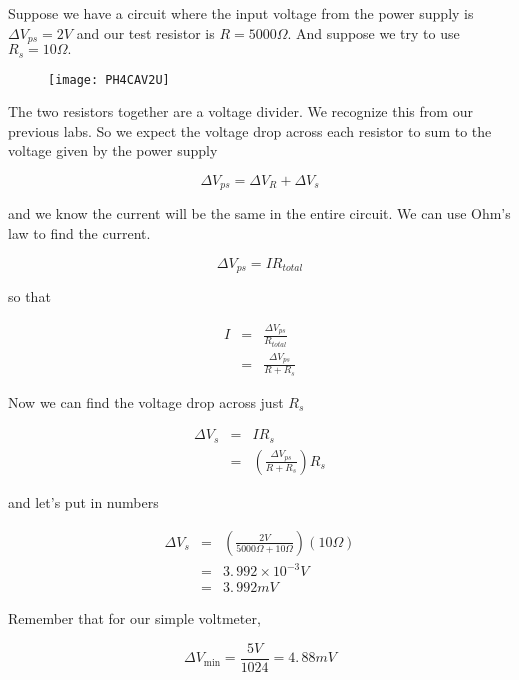 Suppose we have a circuit where the input voltage from the power supply is $\Delta V_{ps}=2\unit{V}$ and our test resistor is $R=5000\unit{\Omega}.$ And suppose we try to use $R_{s}=10\unit{\Omega}.$ 

\begin{figure}[h!]
	\texttt{[image: PH4CAV2U]}
\end{figure}

The two resistors together are a voltage divider. We recognize this from our previous labs. So we expect the voltage drop across each resistor to sum to the voltage given by the power supply

\begin{equation*}
	\Delta V_{ps}=\Delta V_{R}+\Delta V_{s}
\end{equation*}

\noindent and we know the current will be the same in the entire circuit. We can use Ohm's law to find the current.

\begin{equation*}
	\Delta V_{ps}=IR_{total}
\end{equation*}

\noindent so that 

\begin{eqnarray*}
	I &=&\frac{\Delta V_{ps}}{R_{total}} \\
	  &=&\frac{\Delta V_{ps}}{R+R_{s}}
\end{eqnarray*}

Now we can find the voltage drop across just $R_{s}$

\begin{eqnarray*}
	\Delta V_{s} &=&IR_{s} \\
                 &=&\left( \frac{\Delta V_{ps}}{R+R_{s}}\right) R_{s}
\end{eqnarray*}

\noindent and let's put in numbers

\begin{eqnarray*}
	\Delta V_{s} &=&\left(\frac{2\unit{V}}{5000\unit{\Omega}+10\unit{\Omega}}\right) \left( 10\unit{\Omega}\right) \\
    &=&3.\,\allowbreak 992\times 10^{-3}\unit{V} \\
    &=&3.\,\allowbreak 992\unit{mV}
\end{eqnarray*}

\noindent Remember that for our simple voltmeter, 

\begin{equation*}
	\Delta V_{\min }=\frac{5\unit{V}}{1024}=4.\,\allowbreak 88\unit{mV}
\end{equation*}

